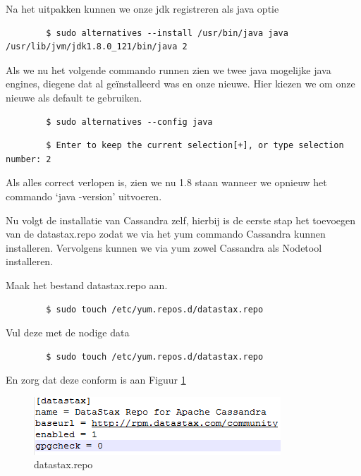 \documentclass{article}
\begin{document}
	\par
	Na het uitpakken kunnen we onze jdk registreren als java optie
	\begin{lstlisting}
		$ sudo alternatives --install /usr/bin/java java /usr/lib/jvm/jdk1.8.0_121/bin/java 2
	\end{lstlisting}
	
	\par
	Als we nu het volgende commando runnen zien we twee java mogelijke java engines, diegene dat al ge\"installeerd was en onze nieuwe. 
	Hier kiezen we om onze nieuwe als default te gebruiken.
	\begin{lstlisting}
		$ sudo alternatives --config java
	\end{lstlisting}
	\begin{lstlisting}
		$ Enter to keep the current selection[+], or type selection number: 2
	\end{lstlisting}
	
	\par
	Als alles correct verlopen is, zien we nu 1.8 staan wanneer we opnieuw het commando ‘java -version’ uitvoeren.
	
	\par
	Nu volgt de installatie van Cassandra zelf, hierbij is de eerste stap het toevoegen van de datastax.repo zodat we via het yum commando Cassandra kunnen installeren.
	 Vervolgens kunnen we via yum zowel Cassandra als Nodetool installeren.
	\par
	Maak het bestand datastax.repo aan.
	\begin{lstlisting}
		$ sudo touch /etc/yum.repos.d/datastax.repo
	\end{lstlisting}
	\par
	Vul deze met de nodige data
	\begin{lstlisting}
		$ sudo touch /etc/yum.repos.d/datastax.repo
	\end{lstlisting}
	En zorg dat deze conform is aan Figuur \ref{fig:datastax.repo}
	\begin{figure}[h!]
  		\includegraphics[width=\linewidth]{images/datastax-repo.PNG}
  		\caption{datastax.repo}
  		\label{fig:datastax.repo}
	\end{figure}
	
\end{document}
